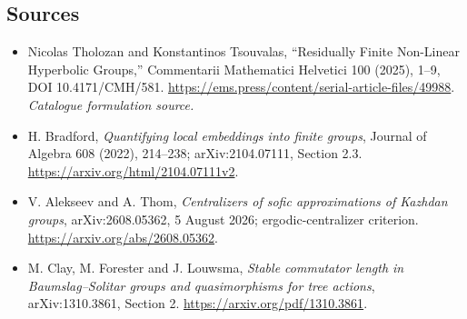 \documentclass[11pt,a4paper]{article}
\numberwithin{equation}{section}
\begin{document}
\subsection{Sources}
\begin{itemize}\raggedright
\item[\textnormal{[S1]}]\hypertarget{source:30006750:1}{} Nicolas Tholozan and Konstantinos Tsouvalas, “Residually Finite Non-Linear Hyperbolic Groups,” Commentarii Mathematici Helvetici 100 (2025), 1–9, DOI 10.4171/CMH/581.
\url{https://ems.press/content/serial-article-files/49988}.
{\small\textit{Catalogue formulation source.}}
\item[\textnormal{[E1]}]\hypertarget{extra:30006750:1}{} H. Bradford,
\emph{Quantifying local embeddings into finite groups}, Journal of Algebra
608 (2022), 214--238; arXiv:2104.07111, Section 2.3.
\url{https://arxiv.org/html/2104.07111v2}.
\item[\textnormal{[E2]}]\hypertarget{extra:30006750:2}{} V. Alekseev and A. Thom,
\emph{Centralizers of sofic approximations of Kazhdan groups},
arXiv:2608.05362, 5 August 2026; ergodic-centralizer criterion.
\url{https://arxiv.org/abs/2608.05362}.
\item[\textnormal{[E3]}]\hypertarget{extra:30006750:3}{} M. Clay, M. Forester
and J. Louwsma, \emph{Stable commutator length in Baumslag--Solitar groups
and quasimorphisms for tree actions}, arXiv:1310.3861, Section 2.
\url{https://arxiv.org/pdf/1310.3861}.

\end{itemize}
\end{document}
